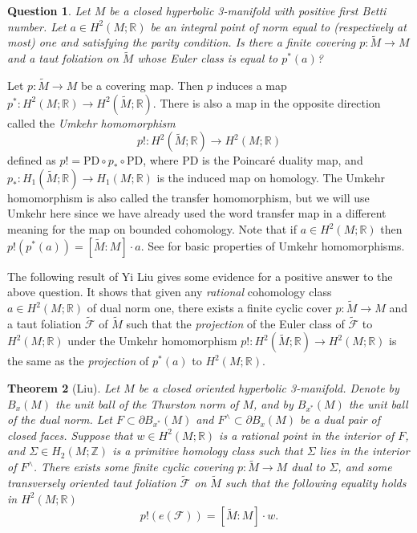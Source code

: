 \documentclass[11pt]{amsart}
\newtheorem{thm}{Theorem}[section]
\newtheorem{question}[thm]{Question}
\theoremstyle{remark}
\theoremstyle{definition}
\begin{document}
	\begin{question}
		Let $M$ be a closed hyperbolic 3-manifold with positive first Betti number. Let $a \in H^2(M ; \mathbb{R})$ be an integral point of norm equal to (respectively at most) one and satisfying the parity condition. Is there a finite covering $p \colon \tilde{M} \rightarrow M$ and a taut foliation on $\tilde{M}$ whose Euler class is equal to $p^*(a)$?
		\label{que:virtual-taut foliation}
	\end{question}

	Let $p \colon \tilde{M} \rightarrow M$ be a covering map. Then $p$ induces a map $p^* \colon H^2(M ; \mathbb{R}) \rightarrow H^2(\tilde{M}; \mathbb{R})$. There is also a map in the opposite direction called the \emph{Umkehr homomorphism} 
	\[ p! \colon H^2(\tilde{M}; \mathbb{R}) \rightarrow H^2(M ; \mathbb{R})\] 
	defined as $p! = \mathrm{PD} \circ p_* \circ \mathrm{PD}$, where $\mathrm{PD}$ is the Poincar\'{e} duality map, and $p_* \colon H_1(\tilde{M}; \mathbb{R}) \rightarrow H_1(M ; \mathbb{R})$ is the induced map on homology. The Umkehr homomorphism is also called the transfer homomorphism, but we will use Umkehr here since we have already used the word transfer map in a different meaning for the map on bounded cohomology. Note that if $a \in H^2(M ; \mathbb{R})$ then $p! (p^*(a)) = [\tilde{M}: M] \cdot a$. See \cite[Section 3G]{hatcher2002algebraic} for basic properties of Umkehr homomorphisms. 
	
	The following result of Yi Liu \cite[Lemma 5.1]{liu2024criterion} gives some evidence for a positive answer to the above question. It shows that given any \emph{rational} cohomology class $a \in H^2(M ; \mathbb{R})$ of dual norm one, there exists a finite cyclic cover $p \colon \tilde{M} \rightarrow M$ and a taut foliation $\tilde{\mathcal{F}}$ of $\tilde{M}$ such that the \emph{projection} of the Euler class of $\tilde{\mathcal{F}}$ to $H^2(M ; \mathbb{R})$ under the Umkehr homomorphism $p! \colon H^2(\tilde{M}; \mathbb{R}) \rightarrow H^2(M ; \mathbb{R})$ is the same as the \emph{projection} of $p^*(a)$ to $H^2(M ; \mathbb{R})$. 
	
	\begin{thm}[Liu]
		Let $M$ be a closed oriented hyperbolic 3-manifold. Denote by $B_x(M)$ the unit ball of the Thurston norm of $M$, and by $B_{x^*}(M)$ the unit ball of the dual norm. Let $F \subset \partial B_{x^*}(M)$ and $F^\wedge \subset \partial B_x(M)$ be a dual pair of closed faces.  Suppose that $w \in H^2(M ; \mathbb{R})$ is a rational point in the interior of $F$, and $\Sigma \in H_2(M ; \mathbb{Z})$ is a primitive homology class such that $\Sigma$ lies in the interior of $F^\wedge$. 
		There exists some finite cyclic covering $p \colon \tilde{M} \rightarrow M$ dual to $\Sigma$, and some transversely oriented taut foliation $\tilde{\mathcal{F}}$ on $\tilde{M}$ such that the following equality holds in $H^2(M ; \mathbb{R})$
		\[ p!(e(\mathcal{F})) = [\tilde{M}: M] \cdot w. \]
		\label{thm:Liu-virtual-taut foliation-projection}
	\end{thm}
\end{document}
